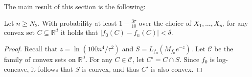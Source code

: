 \documentclass[final,12pt]{colt2018}
\newcommand{\nnew}[1]{{\color{red} #1}}
\newcommand{\nnew}[1]{#1}
\newtheorem{informal theorem}[theorem]{Theorem (informal statement)}
\newcommand{\R}{\mathbb{R}}
\begin{document}

The main result of this section is the following:


\begin{lemma}\label{lem:convex_set_prob}
Let $n \geq N_2$.
With probability at least $1 - \frac{3\tau}{10}$ over the choice of  {$X_1,\ldots,X_n$}, 
for any convex set $C \subseteq \R^d$ it holds that 
$\left| f_0(C) - f_n(C) \right| < \delta$.
\end{lemma}
\begin{proof}
 {Recall that $z = \ln(100 n^4/\tau^2)$ and $S = L_{f_0}(M_{f_0} e^{-z})$}.
\nnew{Let $\mathcal{C}$ be the family of convex sets on $\mathbb{R}^d$.
For any $C \in \mathcal{C}$,} let $C' = C \cap S$.
Since $f_0$ is log-concave, it follows that $S$ is convex, and thus $C'$ is also convex.


\end{proof}
\end{document}
